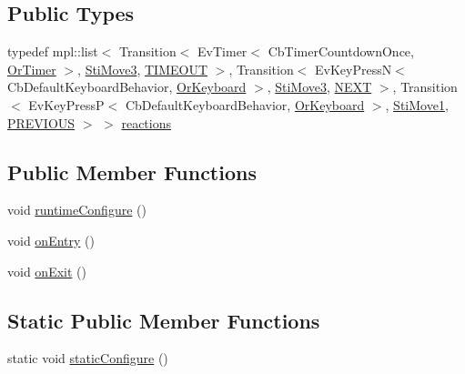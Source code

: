 \subsection*{Public Types}
\begin{DoxyCompactItemize}
\item 
typedef mpl\+::list$<$ Transition$<$ Ev\+Timer$<$ Cb\+Timer\+Countdown\+Once, \hyperlink{classsm__starcraft__ai_1_1OrTimer}{Or\+Timer} $>$, \hyperlink{structsm__starcraft__ai_1_1move__inner__states_1_1StiMove3}{Sti\+Move3}, \hyperlink{structsm__starcraft__ai_1_1move__inner__states_1_1StiMove2_1_1TIMEOUT}{T\+I\+M\+E\+O\+UT} $>$, Transition$<$ Ev\+Key\+PressN$<$ Cb\+Default\+Keyboard\+Behavior, \hyperlink{classsm__starcraft__ai_1_1OrKeyboard}{Or\+Keyboard} $>$, \hyperlink{structsm__starcraft__ai_1_1move__inner__states_1_1StiMove3}{Sti\+Move3}, \hyperlink{structsm__starcraft__ai_1_1move__inner__states_1_1StiMove2_1_1NEXT}{N\+E\+XT} $>$, Transition$<$ Ev\+Key\+PressP$<$ Cb\+Default\+Keyboard\+Behavior, \hyperlink{classsm__starcraft__ai_1_1OrKeyboard}{Or\+Keyboard} $>$, \hyperlink{structsm__starcraft__ai_1_1move__inner__states_1_1StiMove1}{Sti\+Move1}, \hyperlink{structsm__starcraft__ai_1_1move__inner__states_1_1StiMove2_1_1PREVIOUS}{P\+R\+E\+V\+I\+O\+US} $>$ $>$ \hyperlink{structsm__starcraft__ai_1_1move__inner__states_1_1StiMove2_a8187cf9544687d15078665a7065c1360}{reactions}
\end{DoxyCompactItemize}
\subsection*{Public Member Functions}
\begin{DoxyCompactItemize}
\item 
void \hyperlink{structsm__starcraft__ai_1_1move__inner__states_1_1StiMove2_ab3b82e554437f2d8140a55da2d23ea51}{runtime\+Configure} ()
\item 
void \hyperlink{structsm__starcraft__ai_1_1move__inner__states_1_1StiMove2_a837f908f65fd3e5fa1135886fd615a92}{on\+Entry} ()
\item 
void \hyperlink{structsm__starcraft__ai_1_1move__inner__states_1_1StiMove2_a26e877ff946b3193d1eb72502ecab20c}{on\+Exit} ()
\end{DoxyCompactItemize}
\subsection*{Static Public Member Functions}
\begin{DoxyCompactItemize}
\item 
static void \hyperlink{structsm__starcraft__ai_1_1move__inner__states_1_1StiMove2_a5d2748899e99bf46ee3135d41ac1a33f}{static\+Configure} ()
\end{DoxyCompactItemize}
